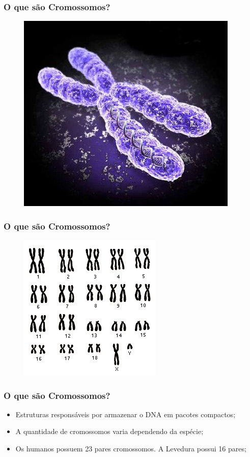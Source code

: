 \documentclass{beamer}
\begin{document}
\begin{frame}
\frametitle{O que são Cromossomos?}
\begin{figure}
\includegraphics[scale=0.5]{chromosome2.jpg}
\end{figure}
\end{frame}

\begin{frame}
\frametitle{O que são Cromossomos?}
\begin{figure}
\includegraphics[scale=0.7]{human_chromosomes.jpg}
\end{figure}
\end{frame}

\begin{frame}
\frametitle{O que são Cromossomos?}
\begin{itemize}
\item Estruturas responsáveis por armazenar o DNA em pacotes compactos;
\item A quantidade de cromossomos varia dependendo da espécie;
\item Os humanos possuem 23 pares cromossomos. A Levedura possui 16 pares;
\end{itemize}
\end{frame}
\end{document}
